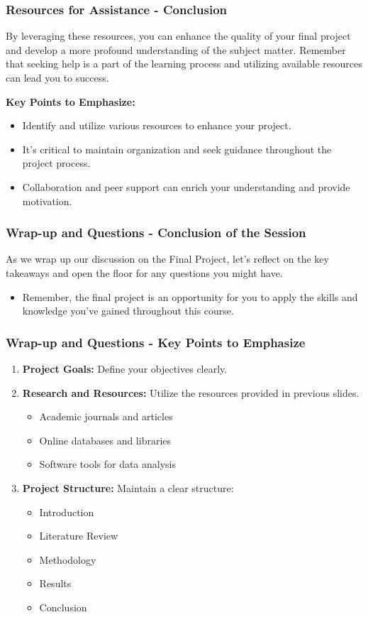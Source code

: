 \documentclass[aspectratio=169]{beamer}
\begin{document}
\begin{frame}[fragile]
    \frametitle{Resources for Assistance - Conclusion}
    By leveraging these resources, you can enhance the quality of your final project and develop a more profound understanding of the subject matter. Remember that seeking help is a part of the learning process and utilizing available resources can lead you to success.
    
    \textbf{Key Points to Emphasize:}
    \begin{itemize}
        \item Identify and utilize various resources to enhance your project.
        \item It’s critical to maintain organization and seek guidance throughout the project process.
        \item Collaboration and peer support can enrich your understanding and provide motivation.
    \end{itemize}
\end{frame}

\begin{frame}[fragile]
    \frametitle{Wrap-up and Questions - Conclusion of the Session}
    As we wrap up our discussion on the Final Project, let's reflect on the key takeaways and open the floor for any questions you might have. 
    \begin{itemize}
        \item Remember, the final project is an opportunity for you to apply the skills and knowledge you’ve gained throughout this course.
    \end{itemize}
\end{frame}

\begin{frame}[fragile]
    \frametitle{Wrap-up and Questions - Key Points to Emphasize}
    \begin{enumerate}
        \item \textbf{Project Goals:} Define your objectives clearly.
        \item \textbf{Research and Resources:} Utilize the resources provided in previous slides.
        \begin{itemize}
            \item Academic journals and articles
            \item Online databases and libraries
            \item Software tools for data analysis
        \end{itemize}
        \item \textbf{Project Structure:} Maintain a clear structure:
        \begin{itemize}
            \item Introduction
            \item Literature Review
            \item Methodology
            \item Results
            \item Conclusion
        \end{itemize}
    \end{enumerate}
\end{frame}
\end{document}
